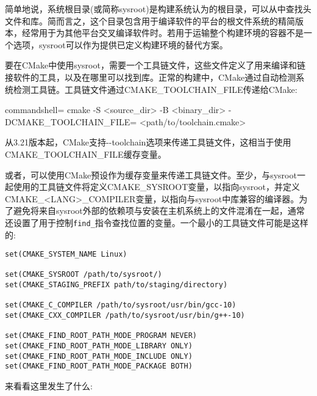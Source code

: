 简单地说，系统根目录(或简称sysroot)是构建系统认为的根目录，可以从中查找头文件和库。简而言之，这个目录包含用于编译软件的平台的根文件系统的精简版本，经常用于为其他平台交叉编译软件时。若用于运输整个构建环境的容器不是一个选项，sysroot可以作为提供已定义构建环境的替代方案。

要在CMake中使用sysroot，需要一个工具链文件，这些文件定义了用来编译和链接软件的工具，以及在哪里可以找到库。正常的构建中，CMake通过自动检测系统检测工具链。工具链文件通过CMAKE\_TOOLCHAIN\_FILE传递给CMake:

\begin{tcblisting}{commandshell={}}
cmake -S <source_dir> -B <binary_dir> -DCMAKE_TOOLCHAIN_FILE=
  <path/to/toolchain.cmake>
\end{tcblisting}

从3.21版本起，CMake支持-{}-toolchain选项来传递工具链文件，这相当于使用CMAKE\_TOOLCHAIN\_FILE缓存变量。

或者，可以使用CMake预设作为缓存变量来传递工具链文件。至少，与sysroot一起使用的工具链文件将定义CMAKE\_SYSROOT变量，以指向sysroot，并定义CMAKE\_<LANG>\_COMPILER变量，以指向与sysroot中库兼容的编译器。为了避免将来自sysroot外部的依赖项与安装在主机系统上的文件混淆在一起，通常还设置了用于控制\texttt{find\_}指令查找位置的变量。一个最小的工具链文件可能是这样的:

\begin{lstlisting}[style=styleCMake]
set(CMAKE_SYSTEM_NAME Linux)

set(CMAKE_SYSROOT /path/to/sysroot/)
set(CMAKE_STAGING_PREFIX path/to/staging/directory)

set(CMAKE_C_COMPILER /path/to/sysroot/usr/bin/gcc-10)
set(CMAKE_CXX_COMPILER /path/to/sysroot/usr/bin/g++-10)

set(CMAKE_FIND_ROOT_PATH_MODE_PROGRAM NEVER)
set(CMAKE_FIND_ROOT_PATH_MODE_LIBRARY ONLY)
set(CMAKE_FIND_ROOT_PATH_MODE_INCLUDE ONLY)
set(CMAKE_FIND_ROOT_PATH_MODE_PACKAGE BOTH)
\end{lstlisting}

来看看这里发生了什么:

